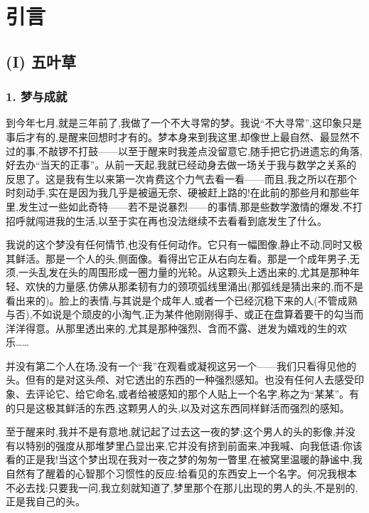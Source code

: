 \chapter{引言}

\section{(I) 五叶草}

\subsection{1. 梦与成就}

 到今年七月,就是三年前了,我做了一个不大寻常的梦。我说“不大寻常”,这印象只是事后才有的,是醒来回想时才有的。梦本身来到我这里,却像世上最自然、最显然不过的事,不敲锣不打鼓——以至于醒来时我差点没留意它,随手把它扔进遗忘的角落,好去办“当天的正事”。从前一天起,我就已经动身去做一场关于我与数学之关系的反思了。这是我有生以来第一次肯费这个力气去看一看——而且,我之所以在那个时刻动手,实在是因为我几乎是被逼无奈、硬被赶上路的!在此前的那些月和那些年里,发生过一些如此奇特——若不是说暴烈——的事情,那是些数学激情的爆发,不打招呼就闯进我的生活,以至于实在再也没法继续不去看看到底发生了什么。

我说的这个梦没有任何情节,也没有任何动作。它只有一幅图像,静止不动,同时又极其鲜活。那是一个人的头,侧面像。看得出它正从右向左看。那是一个成年男子,无须,一头乱发在头的周围形成一圈力量的光轮。从这颗头上透出来的,尤其是那种年轻、欢快的力量感,仿佛从那柔韧有力的颈项弧线里涌出(那弧线是猜出来的,而不是看出来的)。脸上的表情,与其说是个成年人,或者一个已经沉稳下来的人(不管成熟与否),不如说是个顽皮的小淘气,正为某件他刚刚得手、或正在盘算着要干的勾当而洋洋得意。从那里透出来的,尤其是那种强烈、含而不露、迸发为嬉戏的生的欢乐……

 并没有第二个人在场,没有一个“我”在观看或凝视这另一个——我们只看得见他的头。但有的是对这头颅、对它透出的东西的一种强烈感知。也没有任何人去感受印象、去评论它、给它命名,或者给被感知的那个人贴上一个名字,称之为“某某”。有的只是这极其鲜活的东西,这颗男人的头,以及对这东西同样鲜活而强烈的感知。

至于醒来时,我并不是有意地,就记起了过去这一夜的梦;这个男人的头的影像,并没有以特别的强度从那堆梦里凸显出来,它并没有挤到前面来,冲我喊、向我低语:你该看的正是我!当这个梦出现在我对一夜之梦的匆匆一瞥里,在被窝里温暖的静谧中,我自然有了醒着的心智那个习惯性的反应:给看见的东西安上一个名字。何况我根本不必去找:只要我一问,我立刻就知道了,梦里那个在那儿出现的男人的头,不是别的,正是我自己的头。

